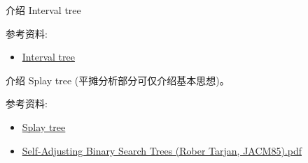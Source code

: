 \documentclass[a4paper, justified]{tufte-handout}
\begin{document}
\begin{solution}
\end{solution}

%
%

\beginot

\begin{ot}
  介绍 Interval tree

  \noindent 参考资料:
  \begin{itemize}
    \item \href{https://en.wikipedia.org/wiki/Interval_tree}{Interval tree}
  \end{itemize}
\end{ot}
\begin{ot}
  介绍 Splay tree (平摊分析部分可仅介绍基本思想)。

  \noindent 参考资料:
  \begin{itemize}
    \item \href{https://en.wikipedia.org/wiki/Splay\_tree}{Splay tree}
    \item \href{https://www.cs.princeton.edu/courses/archive/spring06/cos423/Handouts/self\%20adjusting.pdf}{Self-Adjusting Binary Search Trees (Rober Tarjan, JACM85).pdf}
  \end{itemize}
\end{ot}

% 




\beginfb

% 
% 
\end{document}
